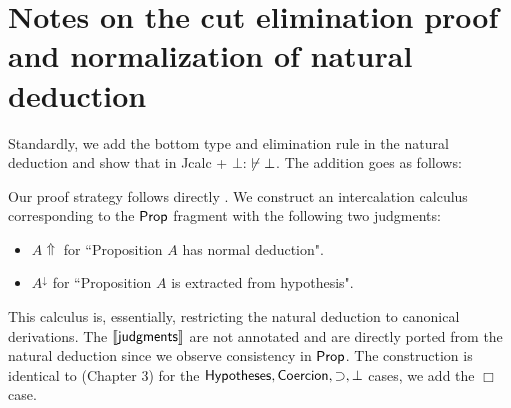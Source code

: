 \chapter{Notes on the cut elimination proof and normalization of natural deduction}
\label{norm}
Standardly, we add the bottom type and elimination rule in the natural deduction and show that in Jcalc + $\bot$: $\centernot\vdash\bot$. The addition goes as follows:

Our proof strategy follows directly \cite{pfenning2004automated}. 
We construct an intercalation calculus \cite{Sieg1998} corresponding to the ${\sf Prop}$ fragment  with the following two judgments:
\begin{itemize}
	\item[] $A\Uparrow$ for ``Proposition $A$ has normal deduction".
	\item[] $A^\downarrow$ for ``Proposition $A$ is extracted from hypothesis".
\end{itemize}
This calculus is, essentially, restricting the natural deduction to canonical derivations. The $\llbracket {\sf judgments} \rrbracket$ are not annotated and are directly ported from the natural deduction since we observe consistency in ${\sf Prop}$. 
The construction is identical to \cite{pfenning2004automated} (Chapter 3) for the ${\sf Hypotheses},{\sf Coercion},\supset, \bot$ cases, we add the $\Box$ case.
